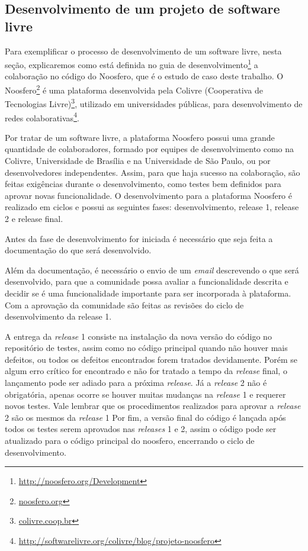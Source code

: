 \subsection{Desenvolvimento de um projeto de software livre}
\label{sec:dev-noosfero}


Para exemplificar o processo de desenvolvimento de um software livre,
nesta seção, explicaremos como está definida no guia de desenvolvimento\footnote{\url{http://noosfero.org/Development}} a colaboração no código do Noosfero, que é o estudo de caso deste trabalho.
%
O Noosfero\footnote{\url{noosfero.org}} é uma plataforma desenvolvida pela Colivre (Cooperativa de Tecnologias Livre)\footnote{\url{colivre.coop.br}}, utilizado em universidades públicas, para desenvolvimento de redes colaborativas\footnote{\url{http://softwarelivre.org/colivre/blog/projeto-noosfero}}.

Por tratar de um software livre, a plataforma Noosfero possui uma grande quantidade 
de colaboradores, formado por equipes de desenvolvimento como na Colivre, Universidade de Brasília e na Universidade de São Paulo, ou por desenvolvedores independentes.
%
Assim, para que haja sucesso na colaboração, são feitas exigências durante o desenvolvimento, como testes bem definidos para aprovar novas funcionalidade.
%
O desenvolvimento para a plataforma Noosfero é realizado em ciclos e
possui as seguintes fases: desenvolvimento, release 1, release 2 e release final.

Antes da fase de desenvolvimento for iniciada é necessário que seja feita a 
documentação do que será desenvolvido.

Além da documentação, é necessário o envio de um \textit{email} descrevendo o que será desenvolvido, para que a comunidade possa avaliar a funcionalidade descrita e decidir se é uma funcionalidade importante para ser incorporada à plataforma. Com a aprovação da comunidade são feitas as revisões do ciclo de desenvolvimento da release 1.

A entrega da \textit{release} 1 consiste na instalação da nova versão do código no repositório de testes, assim como no código principal quando não houver mais defeitos, ou todos os defeitos encontrados forem tratados devidamente. Porém se algum erro crítico for encontrado e não for tratado a tempo da \textit{release} final, o lançamento pode ser adiado para a próxima \textit{release}.
%
Já a \textit{release} 2 não é obrigatória, apenas ocorre se houver muitas mudanças na \textit{release} 1 e requerer novos testes. Vale lembrar que os procedimentos realizados para aprovar a \textit{release} 2 são os mesmos da \textit{release} 1
%
Por fim, a versão final do código é lançada após todos os testes serem aprovados nas \textit{releases} 1 e 2, assim o código pode ser atualizado para o código principal do noosfero, encerrando o ciclo de desenvolvimento.


